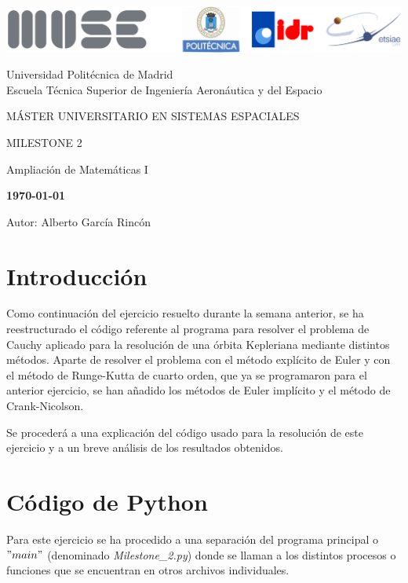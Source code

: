 \documentclass[12pt,a4paper]{article}
\begin{document}
	
\begin{titlepage}
	\centering
	\includegraphics[width=\textwidth]{FIGURES/Portada/Logo_portada.png} 
	\vspace{1.5cm}
	
	Universidad Politécnica de Madrid
	\\Escuela Técnica Superior de Ingeniería Aeronáutica y del Espacio
	\vspace{2cm}
	
	{\large MÁSTER UNIVERSITARIO EN SISTEMAS ESPACIALES}
	\vspace{2cm}
	
	{\LARGE MILESTONE 2}
	\vspace{1cm}
	
	{\large Ampliación de Matemáticas I}
	\vspace{4cm}
	
	\begin{center}
		\large{\textbf{\today}} \\
	\end{center}
	
	Autor: Alberto García Rincón
	\vfill
\end{titlepage}

\newpage
\pagestyle{empty}
\tableofcontents	

\newpage
{}
\setcounter{page}{1}
\pagestyle{fancy} 

\section{Introducción}
Como continuación del ejercicio resuelto durante la semana anterior, se ha reestructurado el código referente al programa para resolver el problema de Cauchy aplicado para la resolución de una órbita Kepleriana mediante distintos métodos. Aparte de resolver el problema con el método explícito de Euler y con el método de Runge-Kutta de cuarto orden, que ya se programaron para el anterior ejercicio, se han añadido los métodos de Euler implícito y el método de Crank-Nicolson.

Se procederá a una explicación del código usado para la resolución de este ejercicio y a un breve análisis de los resultados obtenidos.

\section{Código de Python}
Para este ejercicio se ha procedido a una separación del programa principal o $"main"$ (denominado \textsl{Milestone\_2.py}) donde se llaman a los distintos procesos o funciones que se encuentran en otros archivos individuales.
\end{document}
